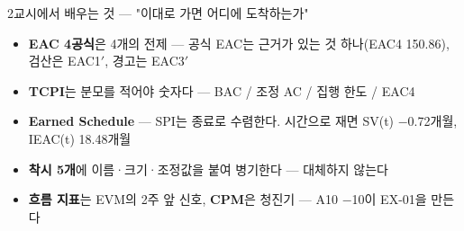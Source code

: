 \begin{frame}{2교시에서 배우는 것 — "이대로 가면 어디에 도착하는가"}
\begin{itemize}
\item \textbf{EAC 4공식}은 4개의 전제 — 공식 EAC는 근거가 있는 것 하나(EAC4 150.86), 검산은 EAC1$'$, 경고는 EAC3$'$
\item \textbf{TCPI}는 분모를 적어야 숫자다 — BAC / 조정 AC / 집행 한도 / EAC4
\item \textbf{Earned Schedule} — SPI는 종료로 수렴한다. 시간으로 재면 SV(t) $-$0.72개월, IEAC(t) 18.48개월
\item \textbf{착시 5개}에 이름·크기·조정값을 붙여 병기한다 — 대체하지 않는다
\item \textbf{흐름 지표}는 EVM의 2주 앞 신호, \textbf{CPM}은 청진기 — A10 $-$10이 EX-01을 만든다
\end{itemize}
\end{frame}

